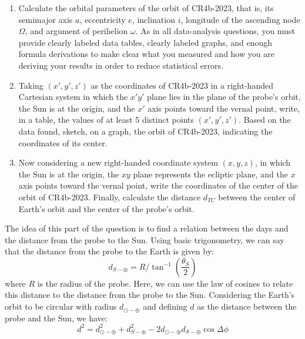 \documentclass[11pt]{article}
\begin{document}
\begin{pproblem}
    \begin{enumerate}[label=(\alph*)]
        \item Calculate the orbital parameters of the orbit of CR4b-2023, that is, its semimajor axis \(a\), eccentricity \(e\), inclination \(i\), longitude of the ascending node \(\Omega\), and argument of perihelion \(\omega\). As in all data-analysis questions, you must provide clearly labeled data tables, clearly labeled graphs, and enough formula derivations to make clear what you measured and how you are deriving your results in order to reduce statistical errors.
        
        \item Taking \((x', y', z')\) as the coordinates of CR4b-2023 in a right-handed Cartesian system in which the \(x'y'\) plane lies in the plane of the probe's orbit, the Sun is at the origin, and the \(x'\) axis points toward the vernal point, write, in a table, the values of at least 5 distinct points \((x', y', z')\). Based on the data found, sketch, on a graph, the orbit of CR4b-2023, indicating the coordinates of its center.
        
        \item Now considering a new right-handed coordinate system \((x, y, z)\), in which the Sun is at the origin, the \(xy\) plane represents the ecliptic plane, and the \(x\) axis points toward the vernal point, write the coordinates of the center of the orbit of CR4b-2023. Finally, calculate the distance \(d_{TC}\) between the center of Earth's orbit and the center of the probe's orbit.
    \end{enumerate}

    \begin{pssolution*}{}{}
        \begin{alternativas}
            \item The idea of this part of the question is to find a relation between the days and the distance from the probe to the Sun. Using basic trigonometry, we can say that the distance from the probe to the Earth is given by:
            \[d_{S-\oplus} = R/\tan^{-1}\left(\frac{\theta_S}{2}\right)\]
            where \(R\) is the radius of the probe.
            Here, we can use the law of cosines to relate this distance to the distance from the probe to the Sun. Considering the Earth's orbit to be circular with radius \(d_{\odot-\oplus}\) and defining \(d\) as the distance between the probe and the Sun, we have:
            \[d^2 = d_{\odot-\oplus}^2+d_{S-\oplus}^2-2d_{\odot-\oplus}d_{S-\oplus}\cos\Delta\phi\]      
            

\end{alternativas}
\end{pssolution*}
\end{pproblem}
\end{document}
